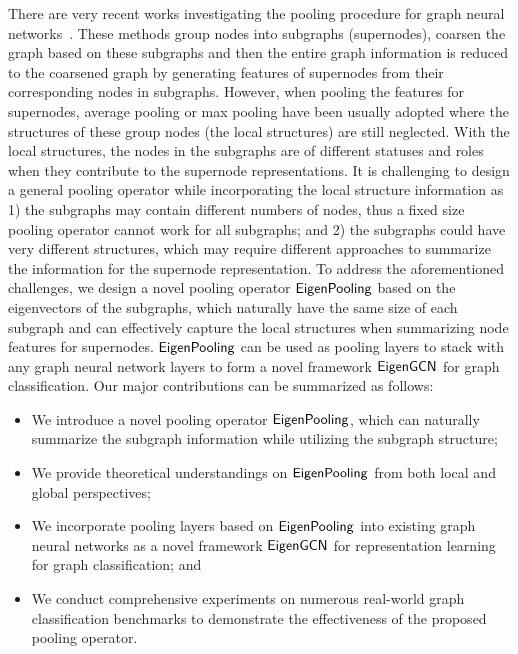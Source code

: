 \documentclass[sigconf]{acmart}
\newcommand{\m}{{\sf {EigenGCN}}}
\newcommand{\pooling}{{\sf {EigenPooling}}}
\begin{document}
 There are very recent works investigating the pooling procedure for graph neural networks~\cite{ying2018hierarchical,defferrard2016convolutional,fey2018splinecnn,simonovsky2017dynamic}. These methods group nodes into subgraphs (supernodes), coarsen the graph based on these subgraphs and then the entire graph information is reduced to the coarsened graph by generating features of supernodes from their corresponding nodes in subgraphs. However, when pooling the features for supernodes, average pooling or max pooling have been usually adopted where the structures of these group nodes (the local structures) are still neglected. With the local structures, the nodes in the subgraphs are of different statuses and roles when they contribute to the supernode representations. It is challenging to design a general pooling operator while incorporating the local structure information as 1) the subgraphs may contain different numbers of nodes, thus a fixed size pooling operator cannot work for all subgraphs; and 2) the subgraphs could have very different structures, which may require different approaches to summarize the information for the supernode representation. To address the aforementioned challenges, we design a novel pooling operator $\pooling$ based on the eigenvectors of the subgraphs, which naturally have the same size of each subgraph and can effectively capture the local structures when summarizing node features for supernodes. $\pooling$ can be used as pooling layers to stack with any graph neural network layers to form a novel framework $\m$ for graph classification. Our major contributions can be summarized as follows:
 
 \begin{itemize}
     \item We introduce a novel pooling operator $\pooling$, which can naturally summarize the subgraph information while utilizing the subgraph structure;
     \item We provide theoretical understandings on $\pooling$ from both local and global perspectives;
     \item We incorporate pooling layers based on $\pooling$ into existing graph neural networks as a novel framework $\m$ for representation learning for graph classification; and 
     \item We conduct comprehensive experiments on numerous real-world graph classification benchmarks to demonstrate the effectiveness of the proposed pooling operator.
 \end{itemize} 
 
\end{document}
